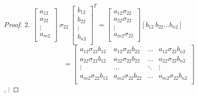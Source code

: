 \documentclass[12pt,a4paper]{report}
\begin{document}
\begin{proof}
2.
$\left[ \begin{array}{c}
         a_{12} \\
         a_{22} \\
         \vdots \\
         a_{m2} \\
         \end{array}
      \right] \: \sigma_{22} \: \left[ \begin{array}{c}
         b_{12} \\
         b_{22} \\
         \vdots \\
         b_{n2} \\
         \end{array}
      \right]^T = \left[
        \begin{array}{c}
         a_{12} \sigma_{22} \\
         a_{22} \sigma_{22} \\
         \vdots \\
         a_{m2} \sigma_{22} \\
         \end{array}
      \right] [b_{12} \: b_{22} \ldots b_{n2}]$
      $$ =  \left[
        \begin{array}{cccc}
         a_{12} \sigma_{22} b_{12}  & a_{12} \sigma_{22} b_{22} & \ldots & a_{12} \sigma_{22} b_{n2}  \\
         a_{22} \sigma_{22} b_{12} & a_{22} \sigma_{22} b_{22} & \ldots & a_{22} \sigma_{22} b_{n2} \\
         \vdots & \ldots & \ddots & \vdots \\
         a_{m2} \sigma_{22} b_{12} & a_{m2} \sigma_{22} b_{22} & \ldots & a_{m2} \sigma_{22} b_{n2} \\
         \end{array}
      \right] $$,
$
\vdots
$
      

\end{proof}
\end{document}
